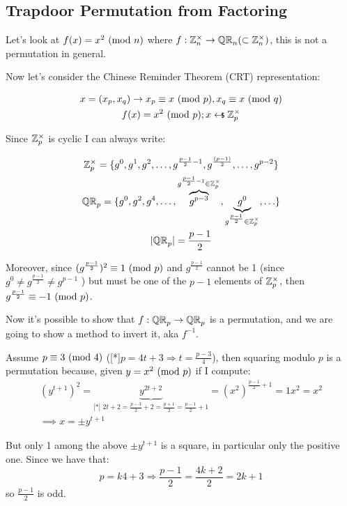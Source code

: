 \subsection{Trapdoor Permutation from Factoring}
Let's look at $f(x) = x^2\Mod{n}$ where $f: \integer_n^\times \to \QR[n] (\subset \integer_n^\times)$, this is not a permutation in general.

Now let's consider the Chinese Reminder Theorem (CRT) representation:

\begin{gather*}
    x=(x_p,x_q) \rightarrow x_p\equiv x\Mod{p} , x_q\equiv x\Mod{q}\\
    f(x)=x^2\Mod{p}; x \pickUAR \integer_p^\times
\end{gather*}

Since $\integer_p^\times$ is cyclic I can always write:

\begin{gather*}
    \integer_p^\times = \{g^0,g^1,g^2,\ldots,g^{\frac{p-1}{2}-1},g^{\frac{(p-1)}{2}},\ldots,g^{p-2} \} \\
    \QR[p]=\{g^0,g^2,g^4,\ldots,\overbrace{g^{p-3}}^{g^{\frac{p-1}{2}-1} \in \integer_p^\times},\underbrace{g^0}_{g^{\frac{p-1}{2}} \in \integer_p^\times},\ldots\} \\
    |\QR[p]|=\frac{p-1}{2}
\end{gather*}

Moreover, since $(g^{\frac{p-1}{2}})^2 \equiv 1 \Mod{p} $ and $g^{\frac{p-1}{2}}$ cannot be 1 (since $g^{0}\not=g^{\frac{p-1}{2}}\not=g^{p-1}$ ) but must be one of the $p-1$ elements of $\integer_p^\times$, then $g^{\frac{p-1}{2}} \equiv -1 \Mod{p}$.

Now it's possible to show that $f: \QR[p]\to \QR[p] $ is a permutation, and we are going to show a method to invert it, aka $f^{-1}$.

Assume $p\equiv 3 \Mod{4}$ ([*]$p=4t+3\Rightarrow t=\frac{p-3}{4}$), then squaring modulo $p$ is a permutation because, given
\underline{$y=x^2 \Mod{p}$} if I compute:
\begin{gather*}
    (y^{t+1})^2=\underbrace{y^{2t+2}}_{\text{[*]
    }2t+2=\frac{p-3}{2}+2=\frac{p+1}{2}=\frac{p-1}{2}+1}=(x^2)^{\frac{p-1}{2}+1}=1x^2=x^2\\
    \implies x=\pm y^{t+1}
\end{gather*}

But only 1 among the above $\pm y^{t+1}$ is a square, in particular only the positive one. Since we have that:
\[ 
    p=k4+3 \Rightarrow \frac{p-1}{2}=\frac{4k+2}{2}=2k+1
\]
so $\frac{p-1}{2}$ is odd.

